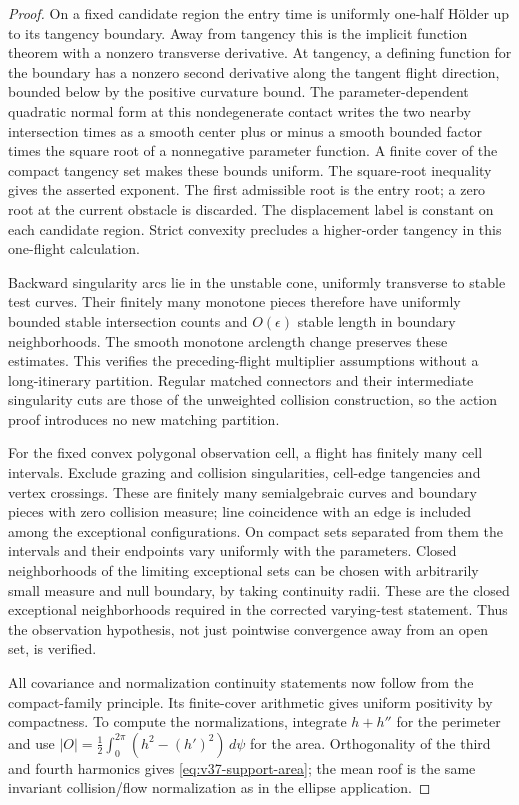 \begin{proof}
On a fixed candidate region the entry time is uniformly one-half
H\"older up to its tangency boundary. Away from tangency this is the
implicit function theorem with a nonzero transverse derivative.
At tangency, a defining function for the boundary has a nonzero
second derivative along the tangent flight direction, bounded below
by the positive curvature bound. The parameter-dependent quadratic
normal form at this nondegenerate contact writes the two nearby
intersection times as a smooth center plus or minus a smooth bounded
factor times the square root of a nonnegative parameter function.
A finite cover of the compact tangency set makes these bounds uniform.
The square-root inequality gives the asserted exponent. The first
admissible root is the entry root; a zero root at the current obstacle
is discarded. The displacement label is constant on each candidate
region. Strict convexity precludes a higher-order tangency in this
one-flight calculation.

Backward singularity arcs lie in the unstable cone, uniformly
transverse to stable test curves. Their finitely many monotone pieces
therefore have uniformly bounded stable intersection counts and
$O(\epsilon)$ stable length in boundary neighborhoods. The smooth
monotone arclength change preserves these estimates. This verifies
the preceding-flight multiplier assumptions without a long-itinerary
partition. Regular matched connectors and their intermediate
singularity cuts are those of the unweighted collision construction,
so the action proof introduces no new matching partition.

For the fixed convex polygonal observation cell, a flight has finitely
many cell intervals. Exclude grazing and collision singularities,
cell-edge tangencies and vertex crossings. These are finitely many
semialgebraic curves and boundary pieces with zero collision measure;
line coincidence with an edge is included among the exceptional
configurations. On compact sets separated from them the intervals and
their endpoints vary uniformly with the parameters. Closed neighborhoods
of the limiting exceptional sets can be chosen with arbitrarily small
measure and null boundary, by taking continuity radii. These are the
closed exceptional neighborhoods required in the corrected varying-test
statement. Thus the observation hypothesis, not just pointwise
convergence away from an open set, is verified.

All covariance and normalization continuity statements now follow
from the compact-family principle. Its finite-cover arithmetic gives
uniform positivity by compactness. To compute the normalizations,
integrate $h+h''$ for the perimeter and use
$|O|=\tfrac12\int_0^{2\pi}(h^2-(h')^2)\,d\psi$ for the area.
Orthogonality of the third and fourth harmonics gives
\eqref{eq:v37-support-area}; the mean roof is the same invariant
collision/flow normalization as in the ellipse application.


\end{proof}
